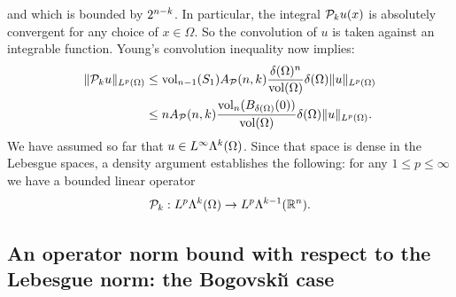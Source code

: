 \documentclass[10pt,letterpaper]{article}
\newcommand\cye[1]{%
\protect\leavevmode
\begingroup
    \color{red!35!yellow}%
    #1%
\endgroup
}
\begin{document}
and which is bounded by $2^{n-k}$. 
In particular, the integral ${\mathcal P}_{k} u(x)$ is absolutely convergent for any choice of $x \in \Omega$. 
So the convolution of $u$ is taken against an integrable function. 
Young's convolution inequality now implies: 
\begin{align*}
    \| {\mathcal P}_{k} u \|_{L^{p}(\Omega)}
    &
    \leq 
    \operatorname{vol}_{n-1}(S_1) A_{{\mathcal P}}(n,k) \frac{ {\delta}(\Omega)^{n} }{\operatorname{vol}(\Omega)} 
    {\delta}(\Omega)
    \| u \|_{L^{p}(\Omega)}
    \\&
    \leq 
    n A_{{\mathcal P}}(n,k) \frac{ \operatorname{vol}_{n}(B_{{\delta}(\Omega)}(0)) }{\operatorname{vol}(\Omega)} 
    {\delta}(\Omega)
    \| u \|_{L^{p}(\Omega)}
    .
\end{align*}
We have assumed so far that $u \in L^{\infty}\Lambda^{k}(\Omega)$. 
Since that space is dense in the Lebesgue spaces, a density argument establishes the following: 
for any $1 \leq p \leq \infty$ we have a bounded linear operator 
\begin{gather*}
    {\mathcal P}_{k} : L^{p}\Lambda^{k}(\Omega) \rightarrow L^{p}\Lambda^{k-1}({\mathbb R}^n).
\end{gather*}
% 


\subsection{\cye{An operator norm bound with respect to the Lebesgue norm: the Bogovski\u{\i} case}}
\end{document}
